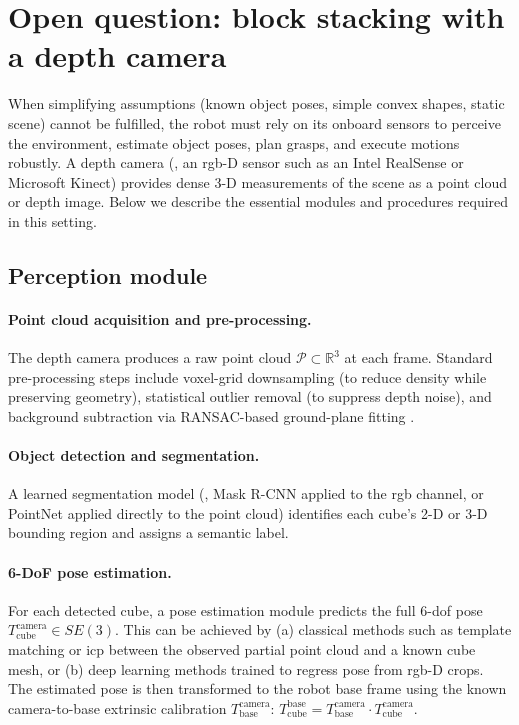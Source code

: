 \documentclass{article}
\begin{document}
\section{Open question: block stacking with a depth camera}
\label{sec:openquestion}

When simplifying assumptions (known object poses, simple convex shapes, static scene) cannot
be fulfilled, the robot must rely on its onboard sensors to perceive the environment,
estimate object poses, plan grasps, and execute motions robustly.
A depth camera (\eg, an \ac{rgb}-D sensor such as an Intel RealSense or Microsoft Kinect)
provides dense 3-D measurements of the scene as a point cloud or depth image.
Below we describe the essential modules and procedures required in this setting.

\subsection{Perception module}

\paragraph{Point cloud acquisition and pre-processing.}
The depth camera produces a raw point cloud $\mathcal{P} \subset \mathbb{R}^3$ at each frame.
Standard pre-processing steps include voxel-grid downsampling (to reduce density while
preserving geometry), statistical outlier removal (to suppress depth noise), and background
subtraction via RANSAC-based ground-plane fitting \citep{thrun2005probabilistic}.

\paragraph{Object detection and segmentation.}
A learned segmentation model (\eg, Mask R-CNN applied to the \ac{rgb} channel, or
PointNet \citep{qi2017pointnet} applied directly to the point cloud) identifies each cube's
2-D or 3-D bounding region and assigns a semantic label.

\paragraph{6-DoF pose estimation.}
For each detected cube, a pose estimation module predicts the full 6-\ac{dof} pose
$T_{\text{cube}}^{\text{camera}} \in SE(3)$.
This can be achieved by (a) classical methods such as template matching or \ac{icp} between
the observed partial point cloud and a known cube mesh, or (b) deep learning methods trained
to regress pose from \ac{rgb}-D crops.
The estimated pose is then transformed to the robot base frame using the known
camera-to-base extrinsic calibration $T_{\text{base}}^{\text{camera}}$:
$T_{\text{cube}}^{\text{base}} = T_{\text{base}}^{\text{camera}} \cdot T_{\text{cube}}^{\text{camera}}$.
\end{document}
